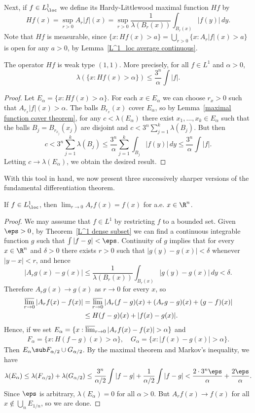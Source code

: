 Next, if $f\in L^1_{\loc}$ we define its Hardy-Littlewood maximal function $Hf$ by
\[Hf(x)=\sup_{r>0}A_r|f|(x)=\sup_{r>0}\frac{1}{\lambda(B_r(x))}\int_{B_r(x)}|f(y)|\,dy.\]
Note that $Hf$ is measurable, since $\{x:Hf(x)>a\}=\bigcup_{r>0}\{x:A_r|f|(x)>a\}$ is open for any $a>0$, by Lemma~\ref{L^1_loc average continuous}.
\begin{theorem}\label{maximal operator weak 1,1}
The operator $Hf$ is weak type $(1,1)$. More precisely, for all $f\in L^1$ and $\alpha>0$,
\[\lambda(\{x:Hf(x)>\alpha\})\leq\frac{3^n}{\alpha}\int|f|.\]
\end{theorem}
\begin{proof}
Let $E_\alpha=\{x:Hf(x)>\alpha\}$. For each $x\in E_\alpha$ we can choose $r_x>0$ such that $A_{r_x}|f|(x)>\alpha$. The balls $B_{r_x}(x)$ cover $E_\alpha$, so by Lemma~\ref{maximal function cover theorem}, for any $c<\lambda(E_\alpha)$ there exist $x_1,\dots,x_k\in E_\alpha$ such that the balls $B_j=B_{r_{x_j}}(x_j)$ are disjoint and $c<3^n\sum_{j=1}^{k}\lambda(B_j)$. But then
\[c<3^n\sum_{j=1}^{k}\lambda(B_j)\leq\frac{3^n}{\alpha}\sum_{j=1}^{k}\int_{B_j}|f(y)|\,dy\leq\frac{3^n}{\alpha}\int|f|.\]
Letting $c\to\lambda(E_\alpha)$, we obtain the desired result.
\end{proof}
With this tool in hand, we now present three successively sharper versions of the fundamental differentiation theorem.
\begin{theorem}\label{L^1_loc average tend to f a.e.}
If $f\in L^1_{\loc}$, then $\lim_{r\to 0}A_rf(x)=f(x)$ for a.e. $x\in\R^n$.
\end{theorem}
\begin{proof}
We may asssume that $f\in L^1$ by restricting $f$ to a bounded set. Given $\eps>0$, by Theorem~\ref{L^1 dense subset} we can find a continuous integrable function $g$ such that $\int|f-g|<\eps$. Continuity of $g$ implies that for every $x\in\R^n$ and $\delta>0$ there exists $r>0$ such that $|g(y)-g(x)|<\delta$ whenever $|y-x|<r$, and hence
\[|A_rg(x)-g(x)|\leq\frac{1}{\lambda(B_r(x))}\int_{B_r(x)}|g(y)-g(x)|\,dy<\delta.\]
Therefore $A_rg(x)\to g(x)$ as $r\to 0$ for every $x$, so
\begin{align*}
\varlimsup_{r\to 0}|A_rf(x)-f(x)|&=\varlimsup_{r\to 0}|A_r(f-g)(x)+(A_rg-g)(x)+(g-f)(x)|\\
&\leq H(f-g)(x)+|f(x)-g(x)|.
\end{align*}
Hence, if we set $E_\alpha=\{x:\varlimsup_{r\to 0}|A_rf(x)-f(x)|>\alpha\}$ and
\begin{equation*}
\begin{aligned}
F_\alpha=\{x:H(f-g)(x)>\alpha\},\quad G_\alpha=\{x:|f(x)-g(x)|>\alpha\}.  
\end{aligned}
\end{equation*}
Then $E_\alpha\sub F_{\alpha/2}\cup G_{\alpha/2}$. By the maximal theorem and Markov's inequality, we have
\[\lambda(E_\alpha)\leq\lambda(F_{\alpha/2})+\lambda(G_{\alpha/2})\leq\frac{3^n}{\alpha/2}\int|f-g|+\frac{1}{\alpha/2}\int|f-g|<\frac{2\cdot 3^n\eps}{\alpha}+\frac{2\eps}{\alpha}.\]
Since $\eps$ is arbitrary, $\lambda(E_\alpha)=0$ for all $\alpha>0$. But $A_rf(x)\to f(x)$ for all $x\notin\bigcup_{n}E_{1/n}$, so we are done.
\end{proof}
